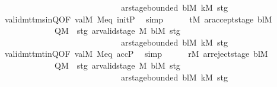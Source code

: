 \begin{isabellebody}
\ \ \ \ \ \ \ \ \ \ \ \ \ \ \ \ \ \ \ \ \ \ \ \ \ \ \ \ {\isasymand}\ ar{\isacharunderscore}{\kern0pt}stage{\isacharunderscore}{\kern0pt}bounded\ bl\isactrlsub M\ k\isactrlsub M\ stg{\isacharbraceright}{\kern0pt}{\isachardoublequoteclose}\isanewline
\ \ \ \ \ \ \isamarkupfalse%
\ valid{\isacharunderscore}{\kern0pt}mttm{\isacharunderscore}{\kern0pt}s{\isacharunderscore}{\kern0pt}in{\isacharunderscore}{\kern0pt}Q{\isacharbrackleft}{\kern0pt}OF\ valM{\isacharbrackright}{\kern0pt}\ M{\isacharunderscore}{\kern0pt}eq\ init{\isacharunderscore}{\kern0pt}P\ \isamarkupfalse%
\ simp\isanewline
\ \ \ \ \isamarkupfalse%
\ {\isachardoublequoteopen}{\isacharparenleft}{\kern0pt}t\isactrlsub M{\isacharcomma}{\kern0pt}\ ar{\isacharunderscore}{\kern0pt}accept{\isacharunderscore}{\kern0pt}stage\ bl\isactrlsub M{\isacharparenright}{\kern0pt}\isanewline
\ \ \ \ \ \ \ \ \ \ \ \ {\isasymin}\ Q\isactrlsub M\ {\isasymtimes}\ {\isacharbraceleft}{\kern0pt}stg{\isachardot}{\kern0pt}\ ar{\isacharunderscore}{\kern0pt}valid{\isacharunderscore}{\kern0pt}stage\ {\isasymGamma}\isactrlsub M\ bl\isactrlsub M\ stg\isanewline
\ \ \ \ \ \ \ \ \ \ \ \ \ \ \ \ \ \ \ \ \ \ \ \ \ \ \ \ {\isasymand}\ ar{\isacharunderscore}{\kern0pt}stage{\isacharunderscore}{\kern0pt}bounded\ bl\isactrlsub M\ k\isactrlsub M\ stg{\isacharbraceright}{\kern0pt}{\isachardoublequoteclose}\isanewline
\ \ \ \ \ \ \isamarkupfalse%
\ valid{\isacharunderscore}{\kern0pt}mttm{\isacharunderscore}{\kern0pt}t{\isacharunderscore}{\kern0pt}in{\isacharunderscore}{\kern0pt}Q{\isacharbrackleft}{\kern0pt}OF\ valM{\isacharbrackright}{\kern0pt}\ M{\isacharunderscore}{\kern0pt}eq\ acc{\isacharunderscore}{\kern0pt}P\ \isamarkupfalse%
\ simp\isanewline
\ \ \ \ \isamarkupfalse%
\ {\isachardoublequoteopen}{\isacharparenleft}{\kern0pt}r\isactrlsub M{\isacharcomma}{\kern0pt}\ ar{\isacharunderscore}{\kern0pt}reject{\isacharunderscore}{\kern0pt}stage\ bl\isactrlsub M{\isacharparenright}{\kern0pt}\isanewline
\ \ \ \ \ \ \ \ \ \ \ \ {\isasymin}\ Q\isactrlsub M\ {\isasymtimes}\ {\isacharbraceleft}{\kern0pt}stg{\isachardot}{\kern0pt}\ ar{\isacharunderscore}{\kern0pt}valid{\isacharunderscore}{\kern0pt}stage\ {\isasymGamma}\isactrlsub M\ bl\isactrlsub M\ stg\isanewline
\ \ \ \ \ \ \ \ \ \ \ \ \ \ \ \ \ \ \ \ \ \ \ \ \ \ \ \ {\isasymand}\ ar{\isacharunderscore}{\kern0pt}stage{\isacharunderscore}{\kern0pt}bounded\ bl\isactrlsub M\ k\isactrlsub M\ stg{\isacharbraceright}{\kern0pt}{\isachardoublequoteclose}\isanewline
\ \ \ \ \ \ \isamarkupfalse%

\end{isabellebody}
